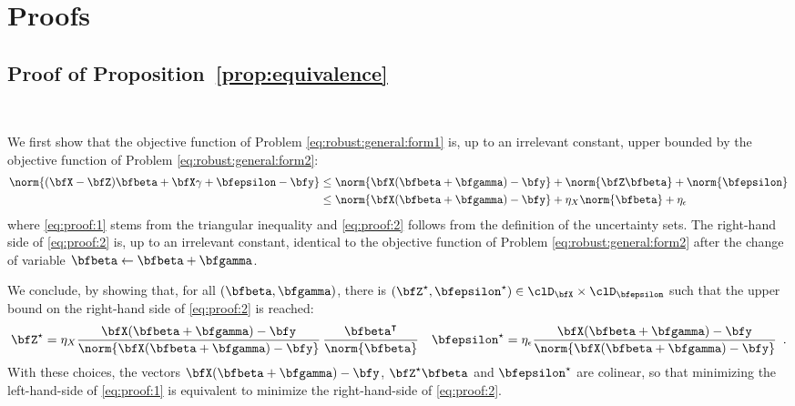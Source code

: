 \section{Proofs}

\subsection{Proof of Proposition~\ref{prop:equivalence}}~\label{sec:proof:prop:equivalence}

We first show that the objective function of Problem
 \eqref{eq:robust:general:form1} is, up to an irrelevant constant, upper bounded
 by the objective function of Problem \eqref{eq:robust:general:form2}:
 \begin{align}
   \norm{(\bfX - \bfZ) \bfbeta + \bfX \gamma + \bfepsilon - \bfy}
   & \leq
   \norm{\bfX (\bfbeta + \bfgamma) - \bfy} +
   \norm{\bfZ \bfbeta}   +
   \norm{\bfepsilon}  \label{eq:proof:1} \\
   & \leq
   \norm{\bfX (\bfbeta + \bfgamma) - \bfy} +
   \eta_X  \norm{\bfbeta} + \eta_\epsilon \label{eq:proof:2}
 \end{align}   
 where \eqref{eq:proof:1} stems from the triangular inequality and
 \eqref{eq:proof:2} follows from the definition of the uncertainty sets.
 The right-hand side of \eqref{eq:proof:2} is, up to an irrelevant constant,
 identical to the objective function of Problem \eqref{eq:robust:general:form2}
 after the change of variable
 $\bfbeta\leftarrow\bfbeta + \bfgamma$.

 We conclude, by showing that, for all $(\bfbeta,\bfgamma)$, there is
 $(\bfZ^\star,\bfepsilon^\star)\in\clD_{\bfX}\times\clD_{\bfepsilon}$ such that
 the upper bound on the right-hand side of \eqref{eq:proof:2} is reached:
 \begin{align*}
   & \bfZ^\star = \eta_X \frac{\bfX (\bfbeta + \bfgamma) - \bfy}{\norm{\bfX (\bfbeta + \bfgamma) - \bfy}}
   \,\frac{\bfbeta^\intercal}{\norm{\bfbeta}}
   & \bfepsilon^\star =  \eta_\epsilon \frac{\bfX (\bfbeta + \bfgamma) - \bfy}{\norm{\bfX (\bfbeta + \bfgamma) - \bfy}}
   \enspace.
 \end{align*}   
 With these choices, the vectors $\bfX (\bfbeta + \bfgamma) - \bfy$,
 $\bfZ^\star\bfbeta$ and $\bfepsilon^\star$ are colinear, so that minimizing the
 left-hand-side of \eqref{eq:proof:1} is equivalent to minimize the
 right-hand-side of \eqref{eq:proof:2}.
 
